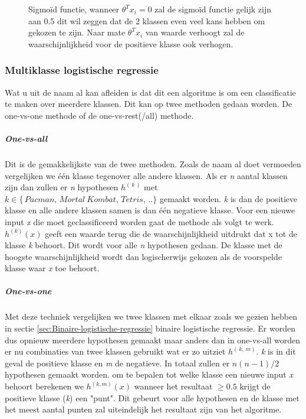\begin{figure}
	\centering
	\caption{Sigmoïd functie, wanneer  $\theta^{T}x_{i} = 0$ zal de sigmoïd functie gelijk zijn aan 0.5 dit wil zeggen dat de 2 klassen even veel kans hebben om gekozen te zijn. Naar mate  $\theta^{T}x_{i}$ van waarde verhoogt zal de waarschijnlijkheid voor de positieve klasse ook verhogen. }
	\label{fig:sigmoid-functie}
\end{figure}
 

\subsubsection{Multiklasse logistische regressie}
\label{sec:Multiklasse-logistische-regressie}
Wat u uit de naam al kan afleiden is dat dit een algoritme is om een classificatie te maken over meerdere klassen. Dit kan op twee methoden gedaan worden. De one-vs-one methode of de one-vs-rest(/all) methode. 
\subparagraph{One-vs-all}
Dit is de gemakkelijkste van de twee methoden. Zoals de naam al doet vermoeden vergelijken we één klasse tegenover alle andere klassen. Als er \textit{n} aantal klassen zijn dan zullen er \textit{n} hypothesen $h^{(\,k\,)}$ met $k \in \{\,Pacman, \, Mortal \:Kombat, \, Tetris, \,..\}$ gemaakt worden. \textit{k} is dan de positieve klasse en alle andere klassen samen is dan één negatieve klasse. \newline
Voor een nieuwe input \textit{x} die moet geclassificeerd worden gaat de methode als volgt te werk. $h^{(k)} (x)$ geeft een waarde terug die de waarschijnlijkheid uitdrukt dat x tot de klasse \textit{k} behoort. Dit wordt voor alle \textit{n} hypothesen gedaan. De klasse met de hoogste waarschijnlijkheid wordt dan logischerwijs gekozen als de voorspelde klasse waar \textit{x} toe behoort. 
\subparagraph{One-vs-one}
Met deze techniek vergelijken we twee klassen met elkaar zoals we gezien hebben in sectie \ref{sec:Binaire-logistische-regressie} binaire logistische regressie. Er worden dus opnieuw meerdere hypothesen gemaakt maar anders dan in one-vs-all worden er nu combinaties van twee klassen gebruikt wat er zo uitziet $h^{(\,k,\,m)}$. \textit{k} is in dit geval de positieve klasse en \textit{m} de negatieve. In totaal zullen er $n(n-1)/2$ hypothesen gemaakt worden.
om te bepalen tot welke klasse een nieuwe input \textit{x} behoort berekenen we $h^{(k,m)}(x)$ wanneer het resultaat $\geq 0.5$ krijgt de positieve klasse (\textit{k}) een "punt". Dit gebeurt voor alle hypothesen en de klasse met het meest aantal punten zal uiteindelijk het resultaat zijn van het algoritme. 

